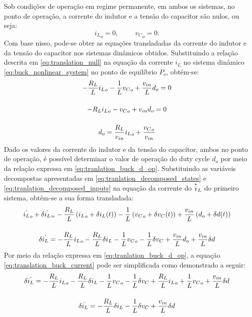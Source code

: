 Sob condições de operação em regime permanente, em ambos os sistemas, no ponto de operação, a corrente do indutor e a tensão do capacitor são nulos, ou seja: \begin{equation} {i_L}_o = 0, \hspace{1cm} {v_C}_o = 0. \label{eq:translation_null}\end{equation} Com base nisso, pode-se obter as equações transladadas da corrente do indutor e da tensão do capacitor nos sistemas dinâmicos obtidos. Substituindo a relação descrita em \eqref{eq:translation_null} na equação da corrente $i_L$ no sistema dinâmico \eqref{eq:buck_nonlinear_system} no ponto de equilíbrio $P_o$, obtém-se: \begin{gather}
  - \frac{R_L}{L} {i_L}_o - \frac{1}{L} {v_C}_o + \frac{v_{in}}{L}  d_o = 0  \notag \\[12pt]
  - R_L {i_L}_o - {v_C}_o + v_{in}  d_o = 0 \notag \\[12pt] 
  d_o = \frac{R_L}{v_{in}} {i_L}_o + \frac{{v_C}_o}{v_{in}} \label{eq:tranlation_buck_d_op}
\end{gather} Dado os valores da corrente do indutor e da tensão do capacitor, ambos no ponto de operação, é possível determinar o valor de operação do duty cycle $d_o$ por meio da relação expressa em \eqref{eq:tranlation_buck_d_op}. Substituindo as variáveis decompostas apresentadas em \eqref{eq:tranlation_decomposed_states} e \eqref{eq:tranlation_decomposed_inputs} na equação da corrente do $\dt{i}_L$ do primeiro sistema, obtém-se a sua forma transladada: \begin{gather}
  {\dot{i_L}}_o + \delta \dot{i_L}_ = - \frac{R_L}{L} \left({i_L}_o + \delta i_L(t)\right) - \frac{1}{L} \left({v_C}_o + \delta v_C(t)\right) + \frac{v_{in}}{L} \left(d_o + \delta d(t)\right) \notag\\[12pt]
  \delta \dot{i_L} = - \frac{R_L}{L} {i_L}_o - \frac{R_L}{L} \delta i_L - \frac{1}{L} {v_C}_o - \frac{1}{L} \delta v_C + \frac{v_{in}}{L} d_o + \frac{v_{in}}{L} \delta d \label{eq:translation_buck_current} 
\end{gather} Por meio da relação expressa em \eqref{eq:tranlation_buck_d_op}, a equação \eqref{eq:translation_buck_current} pode ser simplificada como demonstrado a seguir: \begin{gather}
  \delta \dot{i_L} = - \frac{R_L}{L} {i_L}_o - \frac{R_L}{L} \delta i_L - \frac{1}{L} {v_C}_o - \frac{1}{L} \delta v_C +  \frac{R_L}{L} {i_L}_o + \frac{1}{L} {v_C}_o + \frac{v_{in}}{L} \delta d \notag \\[12pt]
  \delta \dot{i_L} = - \frac{R_L}{L} \delta i_L - \frac{1}{L} \delta v_C  + \frac{v_{in}}{L} \delta d \label{eq:translation_buck_current_simplified} 
\end{gather}

